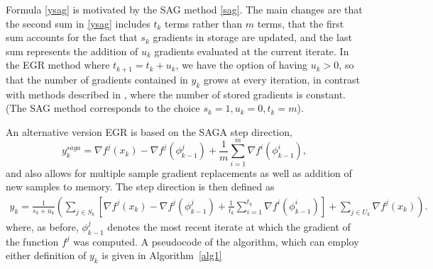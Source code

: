 \documentclass[11pt]{article}
\begin{document}
Formula \eqref{ysag} is motivated by the SAG method \eqref{sag}.   The main changes are that the  second sum in \eqref{ysag}  includes $t_k$ terms rather than $m$ terms, that the first sum accounts for the fact that $s_k$ gradients in storage are updated, and the last sum represents the addition of $ u_k$ gradients evaluated at the current iterate.  In the EGR method where $t_{k+1}= t_{k} + u_k$, we have the option of having $u_k >0$,  so that the number of gradients contained in $y_k$ grows at every iteration, in contrast with methods described in 
\cite{johnson2013accelerating,NIPS2014_5258,shalev2013stochastic,mairal2015incremental,defazio2014finito},
 where the number of stored gradients is constant. (The SAG method corresponds to the choice $s_k=1, u_k =0, t_k=m$).
 
 An alternative version EGR is based on the SAGA step direction,
 \begin{equation}   \label{saga} 
      y_k^{saga}= \nabla f^j(x_k) -  \nabla f^j(\phi_{k-1}^j) +\frac{1}{m}  \sum_{i=1}^{m}  \nabla f^i (\phi^i_{k-1}),
      \end{equation}
and also allows for multiple sample gradient replacements as well as addition of new samples to memory. The step direction is then defined as
\begin{align}  \label{ysaga}
      y_k =  \frac{1}{s_k+u_k} \left(  \sum_{j \in S_k} \left[  \nabla f^j(x_{k}) -   \nabla f^j(\phi_{k-1}^j) + \frac{1}{t_{k}} \sum_{i = 1}^{t_{k} }  \nabla f^i (\phi^i_{k-1})  \right] + \sum_{j \in U_k}  \nabla f^j(x_k)\right).
\end{align}
 where, as before,  $\phi_{k-1}^j$ denotes the most recent iterate at which the gradient of the function $f^j$ was computed.
 A pseudocode of the algorithm, which can employ either definition of $y_k$ is given in Algorithm~\ref{alg1}
\end{document}

